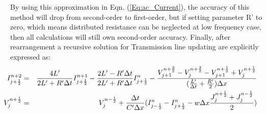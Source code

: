 \documentclass[11pt,final]{scrbook}
\begin{document}
By using this approximation in Eqn. (\ref{Eq:ac_Current}), the accuracy of this method will drop from second-order to first-order, but if setting parameter R' to zero, which means distributed resistance can be neglected at low frequency case, then all calculations will still own second-order accuracy. Finally, after rearrangement a recursive solution for Transmission line updating are explicitly expressed as:
\begin{eqnarray}
 \hspace{-8mm} { I }_{ j+\frac{1}{2} }^{ n+2 } &=& \frac { 4L' }{ 2L'+R'\Delta t }{ I }_{ j+\frac{1}{2} }^{ n+1 }-\frac { 2L'-R'\Delta t }{ 2L'+R'\Delta t }{ I }_{ j+\frac{1}{2} }^{ n }-\frac { { V }_{ j+1 }^{ n+\frac{3}{2} }-{ V }_{ j }^{ n+\frac{3}{2}}-{ V }_{ j+1 }^{ n+\frac{1}{2} }+{ V }_{ j }^{ n+\frac{1}{2} } }{  (\frac { L' }{ \Delta t } +\frac { R' }{ 2 })\Delta x }\label{eq:TL_I}\\
 \hspace{-8mm} { V }_{ j }^{ n+\frac{1}{2} } &=& { V }_{ j }^{ n-\frac{1}{2} } + \frac{ \Delta t }{ C'\Delta x } ({ I }_{ j-\frac{1}{2} }^{ n}-{ I }_{ j+\frac{1}{2} }^{ n } - w\Delta x\frac{{J}_{j}^{n+\frac{1}{2}}+{J}_{j}^{n-\frac{1}{2}}}{2}) \label{eq:TL_U}
\end{eqnarray}
\end{document}
